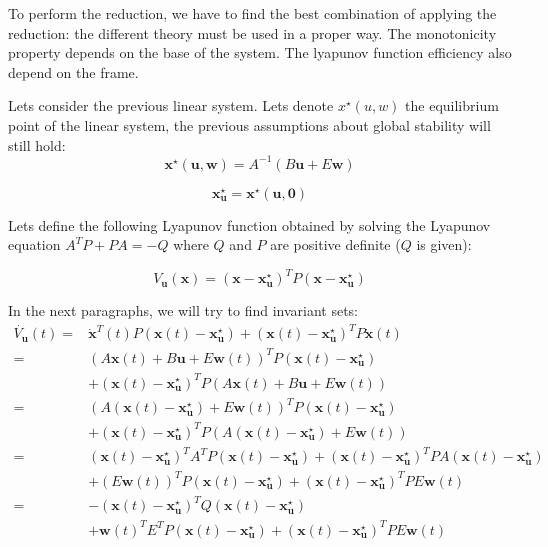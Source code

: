 \documentclass{article}
\theoremstyle{named}
\newcommand{\vect}[1]{\ensuremath{ \mathbf{#1}}}
\begin{document}
To perform the reduction, we have to find the best combination of applying the reduction: the different theory must be used in a proper way. The monotonicity property depends on the base of the system. The lyapunov function efficiency also depend on the frame.

Lets consider the previous linear system.
Lets denote $x^\star(u,w)$ the equilibrium point of the linear system, the previous assumptions about global stability will still hold:
\begin{equation}
\vect{x}^\star(\vect{u},\vect{w}) = A^{-1} (B \vect{u} + E \vect{w})
\end{equation}

\begin{equation}
\vect{x}^{\star}_{\vect{u}} = \vect{x}^\star(\vect{u},\vect{0})
\end{equation}

Lets define the following Lyapunov function obtained by solving the Lyapunov equation $A^T P + P A = -Q$ where $Q$ and $P$ are positive definite ($Q$ is given):

\newcommand{\xu}{\vect{x}^{\star}_{\vect{u}}}
\newcommand{\Vu}{V_{\vect{u}}}
\begin{equation}
\Vu(\vect{x}) = (\vect{x} - \xu) ^T P (\vect{x} - \xu) 
\end{equation}

In the next paragraphs, we will try to find invariant sets:
\begin{align*}
\dot{\Vu}(t) =& \dot{\vect{x}}^T(t) P (\vect{x}(t) - \xu) +  (\vect{x}(t) - \xu)^T P \dot{\vect{x}}(t)
\\
 =& (A \vect{x}(t) + B \vect{u} + E \vect{w}(t))^T P (\vect{x}(t) - \xu)\\
 & + (\vect{x}(t) - \xu)^T P (A \vect{x}(t) + B \vect{u} + E \vect{w}(t))
\\
 =& (A (\vect{x}(t) - \xu) + E \vect{w}(t))^T P (\vect{x}(t) - \xu)\\
 & +(\vect{x}(t) - \xu)^T P (A (\vect{x}(t) - \xu)+ E \vect{w}(t))
\\
 =& (\vect{x}(t) - \xu)^T A^T P (\vect{x}(t) - \xu) +  (\vect{x}(t) - \xu)^T P A (\vect{x}(t) - \xu)\\
 & + (E \vect{w}(t))^T P (\vect{x}(t) - \xu) +  (\vect{x}(t) - \xu)^T P E \vect{w}(t)
\\
 =& - (\vect{x}(t) - \xu)^T Q (\vect{x}(t) - \xu)\\
 & +\vect{w}(t)^T E^T P (\vect{x}(t) - \xu) +  (\vect{x}(t) - \xu)^T P E \vect{w}(t)\\
\end{align*}
\end{document}
